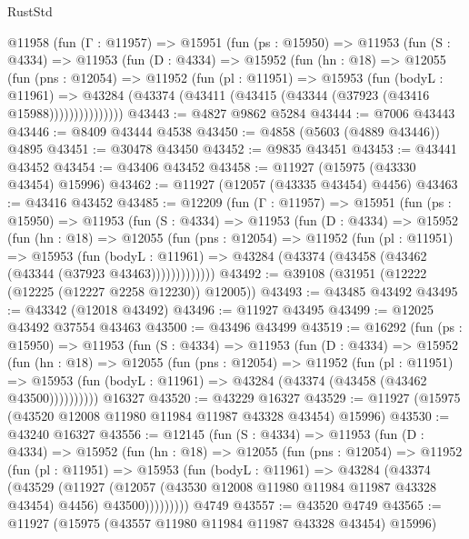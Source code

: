 \begin{lexlean}{RustStd}
\begin{coremodule}
    @11958
      (fun (Γ : @11957) =>
      @15951
        (fun (ps : @15950) =>
        @11953
          (fun (S : @4334) =>
          @11953
            (fun (D : @4334) =>
            @15952
              (fun (hn : @18) =>
              @12055
                (fun (pns : @12054) =>
                @11952
                  (fun (pl : @11951) =>
                  @15953
                    (fun (bodyL : @11961) =>
                    @43284 (@43374 (@43411 (@43415 (@43344 (@37923 (@43416 @15988)))))))))))))))
@43443 := @4827 @9862 @5284
@43444 := @7006 @43443
@43446 := @8409 @43444 @4538
@43450 := @4858 (@5603 (@4889 @43446)) @4895
@43451 := @30478 @43450
@43452 := @9835 @43451
@43453 := @43441 @43452
@43454 := @43406 @43452
@43458 := @11927 (@15975 (@43330 @43454) @15996)
@43462 := @11927 (@12057 (@43335 @43454) @4456)
@43463 := @43416 @43452
@43485 := @12209
    (fun (Γ : @11957) =>
    @15951
      (fun (ps : @15950) =>
      @11953
        (fun (S : @4334) =>
        @11953
          (fun (D : @4334) =>
          @15952
            (fun (hn : @18) =>
            @12055
              (fun (pns : @12054) =>
              @11952
                (fun (pl : @11951) =>
                @15953
                  (fun (bodyL : @11961) =>
                  @43284 (@43374 (@43458 (@43462 (@43344 (@37923 @43463)))))))))))))
@43492 := @39108 (@31951 (@12222 (@12225 (@12227 @2258 @12230)) @12005))
@43493 := @43485 @43492
@43495 := @43342 (@12018 @43492)
@43496 := @11927 @43495
@43499 := @12025 @43492 @37554 @43463
@43500 := @43496 @43499
@43519 := @16292
    (fun (ps : @15950) =>
    @11953
      (fun (S : @4334) =>
      @11953
        (fun (D : @4334) =>
        @15952
          (fun (hn : @18) =>
          @12055
            (fun (pns : @12054) =>
            @11952
              (fun (pl : @11951) =>
              @15953 (fun (bodyL : @11961) => @43284 (@43374 (@43458 (@43462 @43500))))))))))
    @16327
@43520 := @43229 @16327
@43529 := @11927 (@15975 (@43520 @12008 @11980 @11984 @11987 @43328 @43454) @15996)
@43530 := @43240 @16327
@43556 := @12145
    (fun (S : @4334) =>
    @11953
      (fun (D : @4334) =>
      @15952
        (fun (hn : @18) =>
        @12055
          (fun (pns : @12054) =>
          @11952
            (fun (pl : @11951) =>
            @15953
              (fun (bodyL : @11961) =>
              @43284
                (@43374
                  (@43529
                    (@11927
                      (@12057 (@43530 @12008 @11980 @11984 @11987 @43328 @43454) @4456)
                      @43500)))))))))
    @4749
@43557 := @43520 @4749
@43565 := @11927 (@15975 (@43557 @11980 @11984 @11987 @43328 @43454) @15996)

\end{coremodule}
\end{lexlean}
